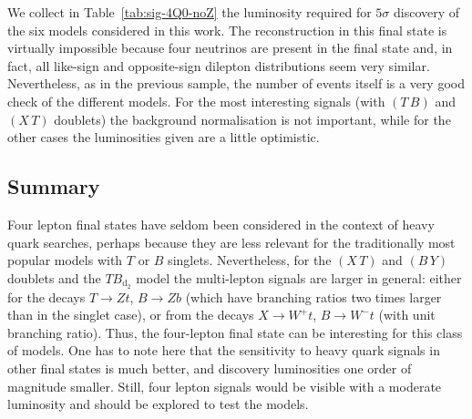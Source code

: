 \documentclass[12pt,a4paper]{article}
\newcommand{\TBD}{TB_{\text{d}_2}}
\newcommand{\TB}{(T \, B)}
\newcommand{\XT}{(X \, T)}
\newcommand{\BY}{(B \, Y)}
\begin{document}
We collect in Table~\ref{tab:sig-4Q0-noZ} the luminosity required for $5\sigma$ discovery of the six models considered in this work.
The reconstruction in this final state is virtually impossible because four neutrinos are present in the final state and, in fact, all like-sign and opposite-sign dilepton distributions seem very similar. Nevertheless, as in the previous sample, the number of events itself is a very good check of the different models.
For the most interesting signals (with $\TB$ and $\XT$ doublets) the background normalisation is not important, while for the other cases the luminosities given are a little optimistic.



\subsection{Summary}

Four lepton final states have seldom been considered in the context of heavy quark searches, perhaps because they are less relevant for the traditionally most popular models with $T$ or $B$ singlets. Nevertheless, for the $\XT$ and $\BY$ doublets and the $\TBD$ model the multi-lepton signals are larger in general: either for the decays $T \to Zt$, $B \to Zb$ (which have branching ratios two times larger than in the singlet case), or from the decays $X \to W^+ t$, $B \to W^- t$ (with unit branching ratio). Thus, the four-lepton final state can be interesting for this class of models. One has to note here that the sensitivity to heavy quark signals in other final states is much better, and discovery luminosities one order of magnitude smaller. Still, four lepton signals would be visible with a moderate luminosity and should be explored to test the models.
\end{document}
